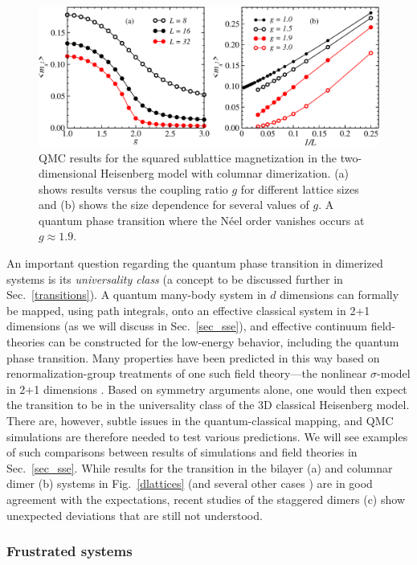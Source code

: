 \documentclass[draft,numberedheadings]{aipproc}
\begin{document}
\begin{figure}
\includegraphics[width=12.5cm, clip]{jjmag2.eps}
\caption{QMC results for the squared sublattice magnetization in the two-dimensional Heisenberg model with columnar dimerization. 
(a) shows results versus the coupling ratio $g$ for different lattice sizes and (b) shows the size dependence for several values of $g$.
A quantum phase transition where the N\'eel order vanishes occurs at $g\approx 1.9$.}
\label{jjmag2}
\end{figure}

An important question regarding the quantum phase transition in dimerized systems is its {\it universality class} (a concept to be discussed further in
Sec.~\ref{transitions}). A quantum many-body system in $d$ dimensions can formally be mapped, using path integrals, onto an effective classical system in 2+1 
dimensions (as we will discuss in Sec.~\ref{sec_sse}), and effective continuum field-theories can be constructed for the low-energy behavior, including
the quantum phase transition. Many properties have been predicted in this way based on renormalization-group treatments of one such field theory---the
nonlinear $\sigma$-model in 2+1 dimensions \cite{chn,chubukov}. Based on symmetry arguments alone, one would then expect the transition to be in the universality 
class of the 3D classical Heisenberg model. There are, however, subtle issues in the quantum-classical mapping, and QMC simulations are therefore needed 
to test various predictions. We will see examples of such comparisons between results of simulations and field theories in Sec.~\ref{sec_sse}. While results 
for the transition in the bilayer (a) \cite{wang} and columnar dimer (b) \cite{matsumoto} systems in Fig.~\ref{dlattices} (and several other cases 
\cite{troyer,wenzel1}) are in good agreement with the expectations, recent studies of the staggered dimers (c) show unexpected deviations \cite{wenzel2} 
that are still not understood.

\subsubsection{Frustrated systems}
\end{document}
